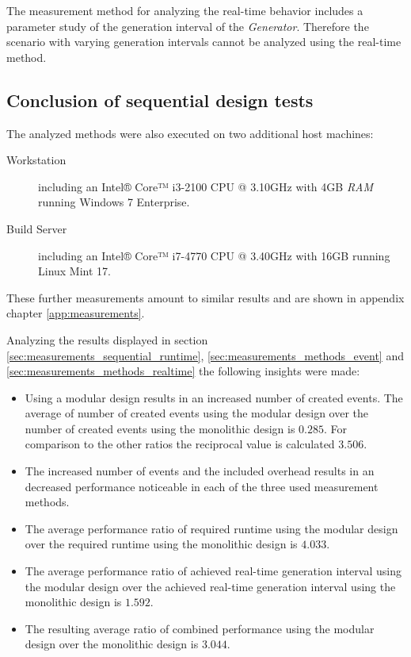 The measurement method for analyzing the real-time behavior includes a parameter study of the generation interval of the \emph{Generator}.
Therefore the scenario with varying generation intervals cannot be analyzed using the real-time method.

\subsection{Conclusion of sequential design tests}
\label{sec:measurements_sequential_conclusion}

The analyzed methods were also executed on two additional host machines:

\begin{description}
    \item[Workstation] including an Intel® Core™ i3-2100 CPU @ 3.10GHz with 4GB \emph{RAM} running Windows 7 Enterprise.
    \item[Build Server] including an Intel® Core™ i7-4770 CPU @ 3.40GHz with 16GB running Linux Mint 17.
\end{description}

These further measurements amount to similar results and are shown in appendix chapter \ref{app:measurements}.

Analyzing the results displayed in section \ref{sec:measurements_sequential_runtime}, \ref{sec:measurements_methods_event} and \ref{sec:measurements_methods_realtime} the following insights were made:

\begin{itemize}
    \item Using a modular design results in an increased number of created events.
    The average of number of created events using the modular design over the number of created events using the monolithic design is $0.285$.
    For comparison to the other ratios the reciprocal value is calculated $3.506$.
    \item The increased number of events and the included overhead results in an decreased performance noticeable in each of the three used measurement methods.
    \item The average performance ratio of required runtime using the modular design over the required runtime using the monolithic design is $4.033$.
    \item The average performance ratio of achieved real-time generation interval using the modular design over the achieved real-time generation interval using the monolithic design is $1.592$.
    \item The resulting average ratio of combined performance using the modular design over the monolithic design is $3.044$.
\end{itemize}

